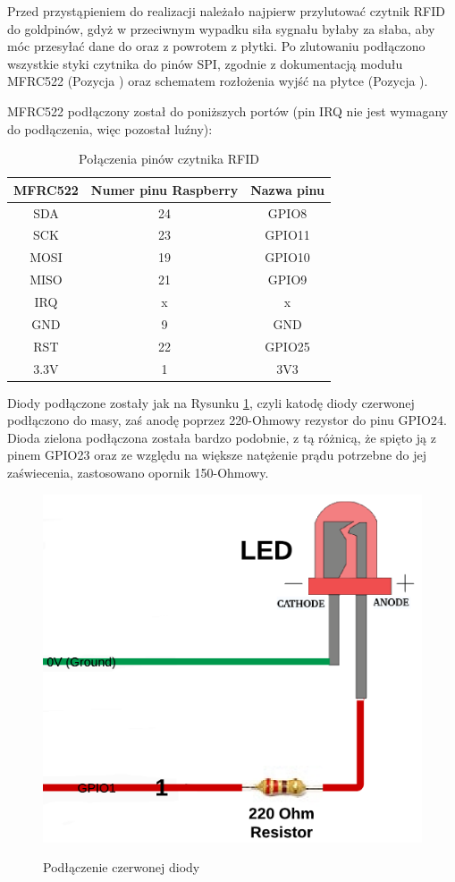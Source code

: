 Przed przystąpieniem do realizacji należało najpierw przylutować czytnik RFID do goldpinów, gdyż w przeciwnym wypadku siła sygnału byłaby za słaba, aby móc przesyłać dane do oraz z powrotem z płytki. Po zlutowaniu podłączono wszystkie styki czytnika do pinów SPI, zgodnie z dokumentacją modułu MFRC522 (Pozycja \cite{mfrc}) oraz schematem rozłożenia wyjść na płytce (Pozycja \cite{piny}).

MFRC522 podłączony został do poniższych portów (pin IRQ nie jest wymagany do podłączenia, więc pozostał luźny):

\begin{table}[h!]
\centering
\caption{Połączenia pinów czytnika RFID}
\label{piny}
\begin{tabular}{@{}|c|c|c|@{}}
\toprule
\textbf{MFRC522} & \textbf{Numer pinu Raspberry} & \textbf{Nazwa pinu} \\ \midrule
SDA & 24 & GPIO8 \\ \midrule
SCK & 23 & GPIO11 \\ \midrule
MOSI & 19 & GPIO10 \\ \midrule
MISO & 21 & GPIO9 \\ \midrule
IRQ & x & x \\ \midrule
GND & 9 & GND \\ \midrule
RST & 22 & GPIO25 \\ \midrule
3.3V & 1 & 3V3 \\ \bottomrule
\end{tabular}
\end{table}

Diody podłączone zostały jak na Rysunku \ref{fig:led}, czyli katodę diody czerwonej podłączono do masy, zaś anodę poprzez 220-Ohmowy rezystor do pinu GPIO24. Dioda zielona podłączona została bardzo podobnie, z tą różnicą, że spięto ją z pinem GPIO23 oraz ze względu na większe natężenie prądu potrzebne do jej zaświecenia, zastosowano opornik 150-Ohmowy.

\begin{figure}[h!]
	\centering
	\includegraphics[width=0.5\linewidth]{img/led.png}
	\label{fig:led}
	\caption[Podłączenie czerwonej diody]{Podłączenie czerwonej diody}
\end{figure}

